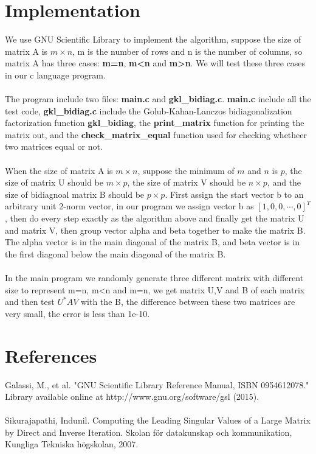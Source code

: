 \documentclass[oneside, 12pt, a4paper]{article}
\begin{document}
\section*{Implementation}

We use GNU Scientific Library to implement the algorithm, suppose the size of matrix A is $m \times n$, m is the number of rows and n is the number of columns, so matrix A has three cases: \textbf{m=n}, \textbf{m<n} and \textbf{m>n}. We will test these three cases in our c language program.\\\\
The program include two files: \textbf{main.c} and \textbf{gkl\_bidiag.c}. \textbf{main.c} include all the test code, \textbf{gkl\_bidiag.c} include the Golub-Kahan-Lanczos bidiagonalization factorization function \textbf{gkl\_bidiag}, the \textbf{print\_matrix} function for printing the matrix out, and the \textbf{check\_matrix\_equal} function used for checking whetheer two matrices equal or not.\\\\
When the size of matrix A is  $m \times n$, suppose the minimum of $m$ and $n$ is $p$, the size of matrix U should be  $m \times p$, the size of matrix V should be  $n \times p$, and the size of bidiagnoal matrix B should be  $p \times p$. First assign the start vector b to an arbitrary unit 2-norm vector, in our program we assign vector b as $[1,0,0,\cdots,0]^T$, then do every step exactly as the algorithm above and finally get the matrix U and matrix V, then group vector alpha and beta together to make the matrix B. The alpha vector is in the main diagonal of the matrix B, and beta vector is in the first diagonal below the main diagonal of the matrix B.\\\\
In the main program we randomly generate three different matrix with different size to represent m=n, m<n and m=n, we get matrix U,V and B of each matrix and then test $U^* A V$ with the B, the difference between these two matrices are very small, the error is less than 1e-10.


\section*{References}

Galassi, M., et al. "GNU Scientific Library Reference Manual, ISBN 0954612078." Library available online at http://www.gnu.org/software/gsl (2015).
\\
\\
Sikurajapathi, Indunil. Computing the Leading Singular Values of a Large Matrix by Direct and Inverse Iteration. Skolan för datakunskap och kommunikation, Kungliga Tekniska högskolan, 2007.
\end{document}
